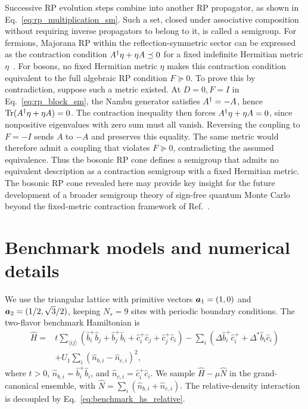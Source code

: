 Successive RP evolution steps combine into another RP propagator, as shown in Eq.~\eqref{eq:rp_multiplication_sm}. Such a set, closed under associative composition without requiring inverse propagators to belong to it, is called a semigroup. For fermions, Majorana RP within the reflection-symmetric sector can be expressed as the contraction condition $A^\dagger\eta+\eta A\preceq0$ for a fixed indefinite Hermitian metric $\eta$~\cite{wei2024prb}. For bosons, no fixed Hermitian metric $\eta$ makes this contraction condition equivalent to the full algebraic RP condition $F\succeq0$. To prove this by contradiction, suppose such a metric existed. At $D=0,F=I$ in Eq.~\eqref{eq:rp_block_sm}, the Nambu generator satisfies $A^\dagger=-A$, hence $\operatorname{Tr}(A^\dagger\eta+\eta A)=0$. The contraction inequality then forces $A^\dagger\eta+\eta A=0$, since nonpositive eigenvalues with zero sum must all vanish. Reversing the coupling to $F=-I$ sends $A$ to $-A$ and preserves this equality. The same metric would therefore admit a coupling that violates $F\succeq0$, contradicting the assumed equivalence. Thus the bosonic RP cone defines a semigroup that admits no equivalent description as a contraction semigroup with a fixed Hermitian metric. The bosonic RP cone revealed here may provide key insight for the future development of a broader semigroup theory of sign-free quantum Monte Carlo beyond the fixed-metric contraction framework of Ref.~\cite{wei2024prb}.

\section{Benchmark models and numerical details}
\label{app:benchmark_details}

We use the triangular lattice with primitive vectors $\bm{a}_1=(1,0)$ and $\bm{a}_2=(1/2,\sqrt3/2)$, keeping $N_s=9$ sites with periodic boundary conditions. The two-flavor benchmark Hamiltonian is
\begin{equation}
\begin{aligned}
    \hat H={}&t\sum_{\langle ij\rangle}
    \left(\hat b_i^+\hat b_j+\hat b_j^+\hat b_i
    +\hat c_i^+\hat c_j+\hat c_j^+\hat c_i\right)
    -\sum_i\left(\Delta\hat b_i^+\hat c_i^+ +\Delta^*\hat b_i\hat c_i\right)\\
    &+U_1\sum_i(\hat n_{b,i}-\hat n_{c,i})^2,
\end{aligned}
\label{eq:benchmark_general}
\end{equation}
where $t>0$, $\hat n_{b,i}=\hat b_i^+\hat b_i$, and $\hat n_{c,i}=\hat c_i^+\hat c_i$. We sample $\hat H-\mu\hat N$ in the grand-canonical ensemble, with $\hat N=\sum_i(\hat n_{b,i}+\hat n_{c,i})$. The relative-density interaction is decoupled by Eq.~\eqref{eq:benchmark_hs_relative}.

